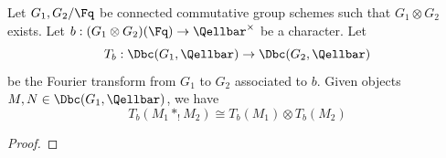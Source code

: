 \begin{theorem}

    Let $G_1,G_2/\Fq$ be connected commutative group schemes such that $G_1 \otimes G_2$ exists. Let $b: (G_1 \otimes G_2)(\Fq) \to \Qellbar^\times$ be a character. Let 
    $$T_{b}: \Dbc(G_1, \Qellbar) \to \Dbc(G_2, \Qellbar)$$
    be the Fourier transform from $G_1$ to $G_2$ associated to $b$.
    Given objects $M,N \in \Dbc(G_1, \Qellbar)$, we have 
    $$T_b(M_1 *_! M_2) \cong T_b(M_1) \otimes T_b(M_2)$$
\end{theorem}
\begin{proof}


\end{proof}
